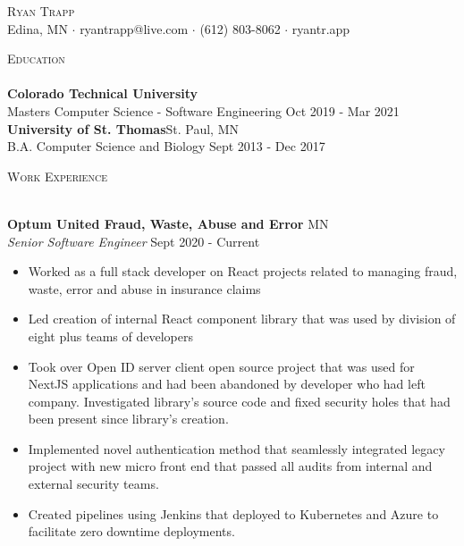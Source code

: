 \documentclass[a4paper]{article}
\newcommand{\lineunder} {
    \vspace*{-8pt} \\
    \hspace*{-18pt} \hrulefill \\
}
\newcommand{\header} [1] {
    {\hspace*{-18pt}\vspace*{6pt} \textsc{#1}}
    \vspace*{-6pt} \lineunder
}
\begin{document}
\vspace*{-40pt}

    

\vspace*{-10pt}
\begin{center}
	{\Huge \scshape {Ryan Trapp}}\\
	Edina, MN $\cdot$ ryantrapp@live.com $\cdot$ (612) 803-8062 $\cdot$ ryantr.app\\
\end{center}

\header{Education}
\textbf{Colorado Technical University}\\
Masters Computer Science - Software Engineering \hfill Oct 2019 - Mar 2021\\
\vspace{2mm}
\textbf{University of St. Thomas}\hfill St. Paul, MN\\
B.A. Computer Science and Biology \hfill Sept 2013 - Dec 2017\\
\vspace{2mm}

\header{Work Experience}
\vspace{1mm}

\textbf{Optum United Fraud, Waste, Abuse and Error} \hfill MN\\
\textit{Senior Software Engineer} \hfill Sept 2020 - Current\\
\vspace{-1mm}
\begin{itemize} \itemsep 1pt
	\item Worked as a full stack developer on React projects related to managing fraud, waste, error and abuse in insurance claims
	\item Led creation of internal React component library that was used by division of eight plus teams of developers
	\item Took over Open ID server client open source project that was used for NextJS applications and had been abandoned by developer who had left company. Investigated library's source code and fixed security holes that had been present since library's creation.
	\item Implemented novel authentication method that seamlessly integrated legacy project with new micro front end that passed all audits from internal and external security teams.
	\item Created pipelines using Jenkins that deployed to Kubernetes and Azure to facilitate zero downtime deployments. 

\end{itemize}
\end{document}
